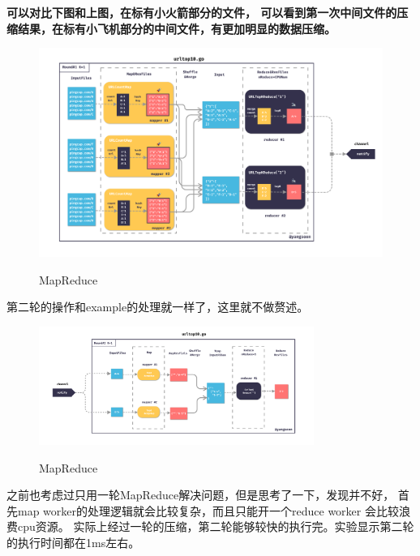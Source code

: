 \documentclass[UTF8]{ctexart}
\begin{document}
\textbf{可以对比下图和上图，在标有小火箭部分的文件，
可以看到第一次中间文件的压缩结果，在标有小飞机部分的中间文件，有更加明显的数据压缩。}
\begin{figure}[H]
  \centering
  \includegraphics[width=1\textwidth]{fig/mr-1.pdf}\\
  \caption{MapReduce}
  \label{mr1}
\end{figure}
第二轮的操作和example的处理就一样了，这里就不做赘述。
\begin{figure}[H]
  \centering
  \includegraphics[width=0.8\textwidth]{fig/mr-2.pdf}\\
  \caption{MapReduce}
  \label{sec2:subsec3:fg1}
\end{figure}

之前也考虑过只用一轮MapReduce解决问题，但是思考了一下，发现并不好，
首先map worker的处理逻辑就会比较复杂，而且只能开一个reduce worker 会比较浪费cpu资源。
实际上经过一轮的压缩，第二轮能够较快的执行完。实验显示第二轮的执行时间都在1ms左右。
\end{document}
